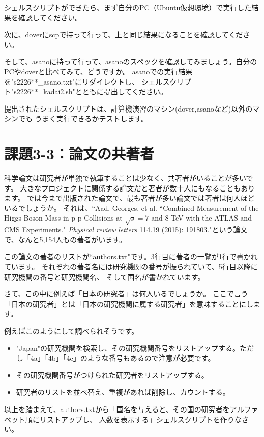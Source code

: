 \documentclass[a4j]{ltjsreport}
\begin{document}
    シェルスクリプトができたら、まず自分のPC（Ubuntu仮想環境）で実行した結果を確認してください。

    次に、doverにscpで持って行って、上と同じ結果になることを確認してください。

    そして、asanoに持って行って、asanoのスペックを確認してみましょう。自分のPCやdoverと比べてみて、どうですか。
    asanoでの実行結果を"s2226**\_asano.txt"にリダイレクトし、
    シェルスクリプト"s2226**\_kadai2.sh"とともに提出してください。

    提出されたシェルスクリプトは、計算機演習のマシン(dover,asanoなど)以外のマシンでも
    うまく実行できるかテストします。

    \section{課題3-3：論文の共著者}
    科学論文は研究者が単独で執筆することは少なく、共著者がいることが多いです。
    大きなプロジェクトに関係する論文だと著者が数十人にもなることもあります。
    では今まで出版された論文で、最も著者が多い論文では著者は何人ほどいるでしょうか。
    それは、``Aad, Georges, et al. ``Combined Measurement of the Higgs Boson Mass in p p Collisions at $\sqrt{s} = 7$ and $8$ TeV with the ATLAS and CMS Experiments." \textit{Physical review letters} 114.19 (2015): 191803."という論文で、なんと5,154人もの著者がいます。

    この論文の著者のリストが``authors.txt"です。3行目に著者の一覧が1行で書かれています。
    それぞれの著者名には研究機関の番号が振られていて、5行目以降に研究機関の番号と研究機関名、
    そして国名が書かれています。

    さて、この中に例えば「日本の研究者」は何人いるでしょうか。
    ここで言う「日本の研究者」とは「日本の研究機関に属する研究者」を意味することにします。

    例えばこのようにして調べられそうです。
    \begin{itemize} 
        \item "Japan"の研究機関を検索し、その研究機関番号をリストアップする。ただし「4a」「4b」「4c」のような番号もあるので注意が必要です。
        \item その研究機関番号がつけられた研究者をリストアップする。
        \item 研究者のリストを並べ替え、重複があれば削除し、カウントする。
    \end{itemize}

    以上を踏まえて、authors.txtから「国名を与えると、その国の研究者をアルファベット順にリストアップし、
    人数を表示する」シェルスクリプトを作りなさい。
\end{document}
